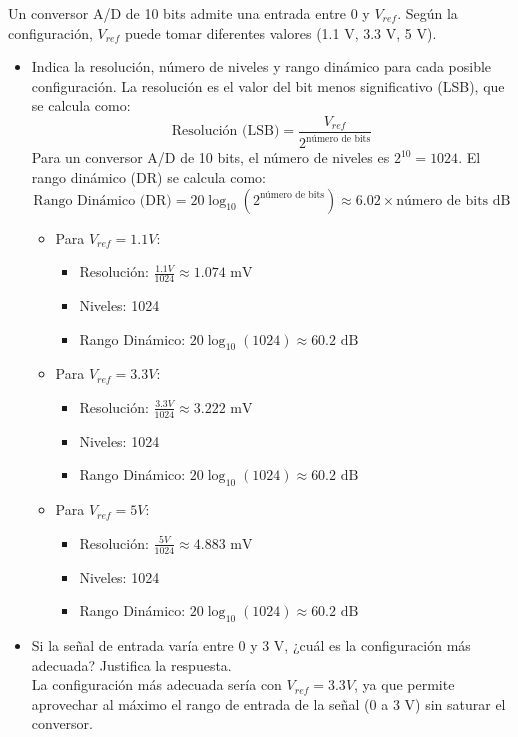 \documentclass[10pt,twoside,spanish,a4paper]{article}
\begin{document}
\begin{itemize}
		\itemP Un conversor A/D de 10 bits admite una entrada entre 0 y $V_{ref}$. Según la configuración, $V_{ref}$ puede tomar diferentes valores (1.1 V, 3.3 V, 5 V).
		\begin{itemize}
			\item Indica la resolución, número de niveles y rango dinámico para cada posible configuración.
			La resolución es el valor del bit menos significativo (LSB), que se calcula como:
			\[ \text{Resolución (LSB)} = \frac{V_{ref}}{2^{\text{número de bits}}} \]
			Para un conversor A/D de 10 bits, el número de niveles es $2^{10} = 1024$.
			El rango dinámico (DR) se calcula como:
			\[ \text{Rango Dinámico (DR)} = 20 \log_{10}(2^{\text{número de bits}}) \approx 6.02 \times \text{número de bits} \text{ dB} \]
			\begin{itemize}
				\item Para $V_{ref} = 1.1 V$:
				\begin{itemize}
					\item Resolución: $\frac{1.1 V}{1024} \approx 1.074 \text{ mV}$
					\item Niveles: 1024
					\item Rango Dinámico: $20 \log_{10}(1024) \approx 60.2 \text{ dB}$
				\end{itemize}
				\item Para $V_{ref} = 3.3 V$:
				\begin{itemize}
					\item Resolución: $\frac{3.3 V}{1024} \approx 3.222 \text{ mV}$
					\item Niveles: 1024
					\item Rango Dinámico: $20 \log_{10}(1024) \approx 60.2 \text{ dB}$
				\end{itemize}
				\item Para $V_{ref} = 5 V$:
				\begin{itemize}
					\item Resolución: $\frac{5 V}{1024} \approx 4.883 \text{ mV}$
					\item Niveles: 1024
					\item Rango Dinámico: $20 \log_{10}(1024) \approx 60.2 \text{ dB}$
				\end{itemize}
			\end{itemize}
			\item Si la señal de entrada varía entre 0 y 3 V, ¿cuál es la configuración más adecuada? Justifica la respuesta.\\
			La configuración más adecuada sería con $V_{ref} = 3.3 V$, ya que permite aprovechar al máximo el rango de entrada de la señal (0 a 3 V) sin saturar el conversor.

\end{itemize}
\end{itemize}
\end{document}
